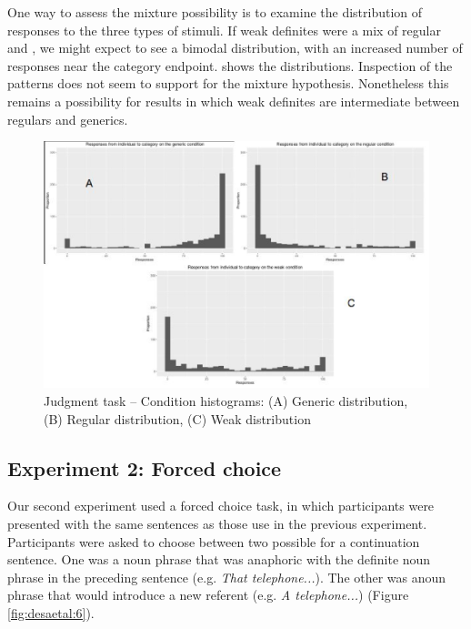 \documentclass[output=paper,
modfonts
]{langscibook}
\begin{document}
One way to assess the mixture possibility is to examine the distribution of responses to the three types of stimuli.  If weak definites were a mix of regular and , we might expect to see a bimodal distribution, with an increased number of responses near the category endpoint.  shows the distributions. Inspection of the patterns does not seem to support for the mixture hypothesis. Nonetheless this remains a possibility for results in which weak definites are intermediate between regulars and generics.   

\begin{figure}[H]
\centering
\includegraphics[width=1\textwidth]{figures/graf_hist}
\caption{Judgment task -- Condition histograms: (A) Generic distribution, (B) Regular distribution, (C) Weak distribution}
\label{fig:desaetal:5}
\end{figure}

\subsection{Experiment 2: Forced choice}

Our second experiment used a forced choice task, in which participants were presented with the same sentences as those use in the previous experiment. Participants were asked to choose between two possible  for a continuation sentence.  One was a noun phrase that was anaphoric with the definite noun phrase in the preceding sentence (e.g. \textit{That telephone...}).  The other was a\largerpage noun phrase that would introduce a new referent (e.g. \textit{A telephone...}) (Figure \ref{fig:desaetal:6}). 
\end{document}
